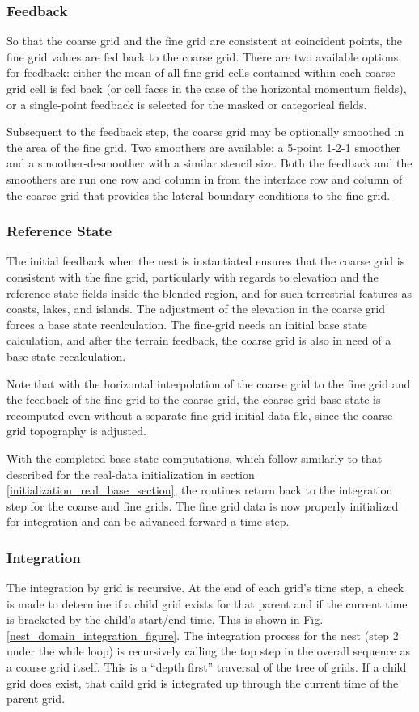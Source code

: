 \subsubsection{Feedback}
So that the coarse grid and the fine grid are consistent at coincident points, the 
fine grid values are fed back to the coarse grid.
There are two available 
options for feedback: either the mean of all fine grid cells contained 
within each coarse grid cell is fed back (or cell faces in the case of the
horizontal momentum fields), or a single-point feedback 
is selected for the masked or categorical fields.

Subsequent to the feedback step, the coarse grid may be optionally smoothed in the area
of the fine grid.  Two smoothers are available: a 5-point 1-2-1 smoother and a smoother-desmoother
with a similar stencil size.
Both the feedback and the smoothers are run one row and column in from the 
interface row and column of the coarse grid that provides
the lateral boundary conditions to the fine grid.

\subsubsection{Reference State}
The initial feedback when the nest is instantiated ensures
that the coarse grid is consistent with the fine grid, particularly 
with regards to elevation and the reference state fields inside the blended region, and for such 
terrestrial features as coasts, lakes, and islands.  The adjustment 
of the elevation in the coarse grid forces a base state recalculation.  
The fine-grid needs an initial base state calculation, and after
the terrain feedback, the coarse grid is also in need of a base state
recalculation.

Note that with the horizontal interpolation of the coarse grid 
to the fine grid and the feedback of the fine grid to the coarse 
grid, 
the coarse grid base state is recomputed 
even without a separate fine-grid initial data file, 
since the coarse grid topography is adjusted.

With the completed base state computations, which follow similarly to
that described for the real-data initialization in section
\ref{initialization_real_base_section},
the routines return 
back to the integration step for the coarse and fine grids.
The fine grid data is now properly initialized for integration and
can be advanced forward a time step.

\subsubsection{Integration}

The integration by grid is recursive.  At the end of each grid's time step, a check
is made to determine if a child grid exists for that parent and if the
current time is bracketed by the child's start/end time.  
This is shown in Fig. \ref{nest_domain_integration_figure}.  The integration process for the nest (step 2 under the
while loop) is recursively calling the top step in the overall sequence as a coarse grid itself.
This is a ``depth first'' 
traversal of the tree of grids.
If a child grid does exist, that child grid is integrated up through the current time of 
the parent grid.
